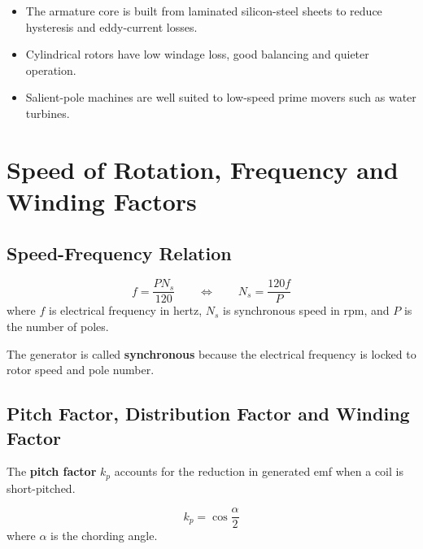 \documentclass[12pt,a4paper]{article}
\newcommand{\kp}{k_p}
\begin{document}
\begin{itemize}[leftmargin=*]
  \item The armature core is built from laminated silicon-steel sheets to reduce hysteresis and eddy-current losses.
  \item Cylindrical rotors have low windage loss, good balancing and quieter operation.
  \item Salient-pole machines are well suited to low-speed prime movers such as water turbines.
\end{itemize}

\section{Speed of Rotation, Frequency and Winding Factors}

\subsection{Speed-Frequency Relation}

\begin{formulabox}
\[
  f = \frac{P N_s}{120}
  \qquad\Longleftrightarrow\qquad
  N_s = \frac{120f}{P}
\]
where \(f\) is electrical frequency in hertz, \(N_s\) is synchronous speed in rpm, and \(P\) is the number of poles.
\end{formulabox}

\begin{notebox}
The generator is called \textbf{synchronous} because the electrical frequency is locked to rotor speed and pole number.
\end{notebox}

\subsection{Pitch Factor, Distribution Factor and Winding Factor}

\begin{definebox}
The \textbf{pitch factor} \(\kp\) accounts for the reduction in generated emf when a coil is short-pitched.
\end{definebox}

\begin{formulabox}
\[
  \kp = \cos\frac{\alpha}{2}
\]
where \(\alpha\) is the chording angle.
\end{formulabox}
\end{document}
